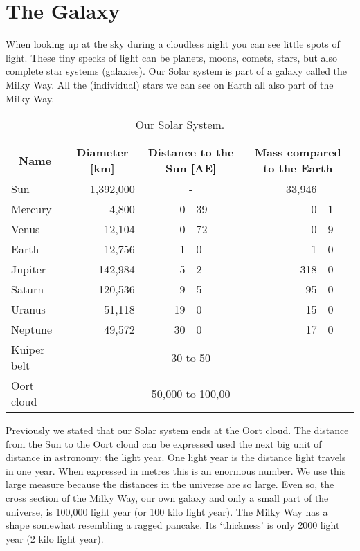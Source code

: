 \section{The Galaxy}
When looking up at the sky during a cloudless night you can see little spots of light. These tiny specks of light can be planets, moons, comets, stars, but also complete star systems (galaxies). Our Solar system is part of a galaxy called the Milky Way. All the (individual) stars we can see on Earth all also part of the Milky Way.
\begin{table}[h]\begin{centering}
\begin{tabular}{|l|r|r@{.}l|r@{.}l|}
\hline \multicolumn{1}{|c|}{Name} & \multicolumn{1}{c|}{Diameter [km]} & \multicolumn{2}{c|}{Distance to the Sun [AE]} & \multicolumn{2}{c|}{Mass compared to the Earth} \\ \hline \hline
Sun & 1,392,000 & \multicolumn{2}{c|}{-} & 33,946& \\ \hline
Mercury & 4,800 & 0&39 & 0&1 \\ \hline
Venus & 12,104 & 0&72 & 0&9 \\ \hline
Earth & 12,756 & 1&0 & 1&0 \\ \hline
Jupiter & 142,984 & 5&2 & 318&0 \\ \hline
Saturn & 120,536 & 9&5 & 95&0 \\ \hline
Uranus & 51,118 & 19&0 & 15&0 \\ \hline
Neptune & 49,572 & 30&0 & 17&0 \\ \hline
Kuiper belt & & \multicolumn{2}{c|}{30 to 50} & \multicolumn{2}{c|}{}\\ \hline
Oort cloud & & \multicolumn{2}{c|}{50,000 to 100,00} & \multicolumn{2}{c|}{} \\ \hline
\end{tabular}
\caption{Our Solar System.}\label{tab:sol_sys}
\end{centering}\end{table}

Previously we stated that our Solar system ends at the Oort cloud. The distance from the Sun to the Oort cloud can be expressed used the next big unit of distance in astronomy: the light year. One light year is the distance light travels in one year. When expressed in metres this is an enormous number. We use this large measure because the distances in the universe are so large. Even so, the cross section of the Milky Way, our own galaxy and only a small part of the universe, is 100,000 light year (or 100 kilo light year). The Milky Way has a shape somewhat resembling a ragged pancake. Its `thickness' is only 2000 light year (2 kilo light year).

